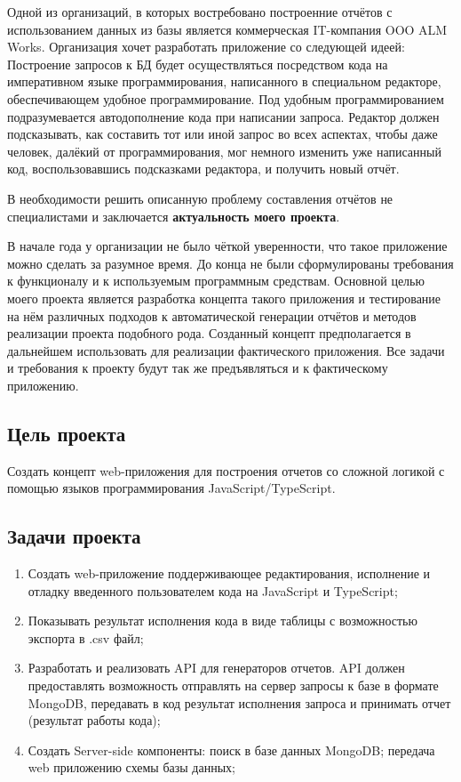 \documentclass[12pt]{article}
\begin{document}
    Одной из организаций, в которых востребовано построенние отчётов с использованием данных из базы является коммерческая IT-компания OOO ALM Works.
    Организация хочет разработать приложение со следующей идеей:\\
    Построение запросов к БД будет осуществляться посредством кода на императивном языке программирования, написанного в специальном редакторе,
    обеспечивающем удобное программирование. Под удобным программированием подразумевается автодополнение кода при написании запроса. Редактор должен
    подсказывать, как составить тот или иной запрос во всех аспектах, чтобы даже человек, далёкий от программирования, мог немного изменить уже написанный
    код, воспользовавшись подсказками редактора, и получить новый отчёт.

    В необходимости решить описанную проблему составления отчётов не специалистами и заключается \textbf{актуальность моего проекта}.

    В начале года у организации не было чёткой уверенности, что такое приложение можно сделать за разумное время. До конца не были сформулированы
    требования к функционалу и к используемым программным средствам. Основной целью моего проекта является разработка концепта такого приложения и
    тестирование на нём различных подходов к автоматической генерации отчётов и методов реализации проекта подобного рода.
    Созданный концепт предполагается в дальнейшем использовать для реализации фактического приложения. Все задачи и требования к проекту будут так же
    предъявляться и к фактическому приложению.

    \subsection{Цель проекта}
    Создать концепт web-приложения для построения отчетов со сложной логикой с помощью языков программирования JavaScript/TypeScript.

    \subsection{Задачи проекта}
    \begin{enumerate}
        \item Создать web-приложение поддерживающее редактирования, исполнение и отладку введенного пользователем кода на JavaScript и TypeScript;
        \item Показывать результат исполнения кода в виде таблицы с возможностью экспорта в .csv файл;
        \item Разработать и реализовать API для генераторов отчетов. API должен предоставлять возможность отправлять на
        сервер запросы к базе в формате MongoDB, передавать в код результат исполнения запроса и принимать отчет (результат работы кода);
        \item Создать Server-side компоненты: поиск в базе данных MongoDB; передача web приложению схемы базы данных;
    \end{enumerate}
\end{document}
